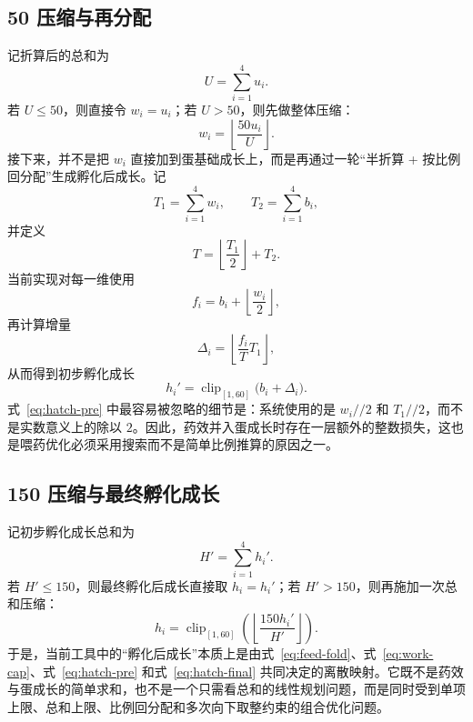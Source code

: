 \subsection{50 压缩与再分配}

记折算后的总和为
\begin{equation}
    U = \sum_{i=1}^{4} u_i.
\end{equation}
若 $U \le 50$，则直接令 $w_i=u_i$；若 $U>50$，则先做整体压缩：
\begin{equation}
    w_i = \left\lfloor \frac{50u_i}{U} \right\rfloor.
    \label{eq:work-cap}
\end{equation}
接下来，并不是把 $w_i$ 直接加到蛋基础成长上，而是再通过一轮“半折算 + 按比例回分配”生成孵化后成长。记
\begin{equation}
    T_1 = \sum_{i=1}^{4} w_i, \qquad T_2 = \sum_{i=1}^{4} b_i,
\end{equation}
并定义
\begin{equation}
    T = \left\lfloor \frac{T_1}{2} \right\rfloor + T_2.
\end{equation}
当前实现对每一维使用
\begin{equation}
    f_i = b_i + \left\lfloor \frac{w_i}{2} \right\rfloor,
\end{equation}
再计算增量
\begin{equation}
    \Delta_i = \left\lfloor \frac{f_i}{T} T_1 \right\rfloor,
\end{equation}
从而得到初步孵化成长
\begin{equation}
    h_i' = \operatorname{clip}_{[1,60]}\bigl(b_i + \Delta_i\bigr).
    \label{eq:hatch-pre}
\end{equation}
式~\eqref{eq:hatch-pre} 中最容易被忽略的细节是：系统使用的是 $w_i//2$ 和 $T_1//2$，而不是实数意义上的除以 $2$。因此，药效并入蛋成长时存在一层额外的整数损失，这也是喂药优化必须采用搜索而不是简单比例推算的原因之一。

\subsection{150 压缩与最终孵化成长}

记初步孵化成长总和为
\begin{equation}
    H' = \sum_{i=1}^{4} h_i'.
\end{equation}
若 $H' \le 150$，则最终孵化后成长直接取 $h_i=h_i'$；若 $H'>150$，则再施加一次总和压缩：
\begin{equation}
    h_i = \operatorname{clip}_{[1,60]}\left(\left\lfloor \frac{150h_i'}{H'} \right\rfloor\right).
    \label{eq:hatch-final}
\end{equation}
于是，当前工具中的“孵化后成长”本质上是由式~\eqref{eq:feed-fold}、式~\eqref{eq:work-cap}、式~\eqref{eq:hatch-pre} 和式~\eqref{eq:hatch-final} 共同决定的离散映射。它既不是药效与蛋成长的简单求和，也不是一个只需看总和的线性规划问题，而是同时受到单项上限、总和上限、比例回分配和多次向下取整约束的组合优化问题。


